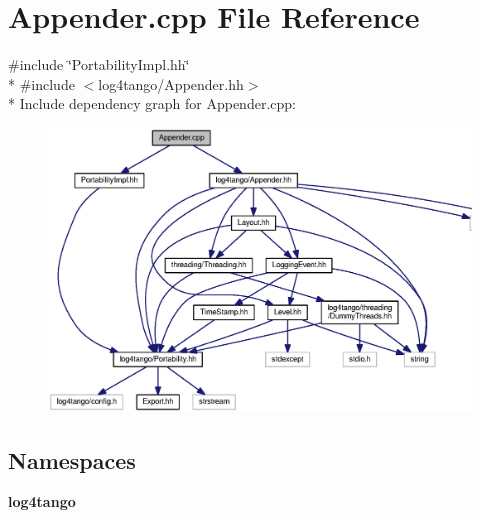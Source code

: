 \section{Appender.\-cpp File Reference}
\label{Appender_8cpp}
{\ttfamily \#include \char`\"{}Portability\-Impl.\-hh\char`\"{}}\\*
{\ttfamily \#include $<$log4tango/\-Appender.\-hh$>$}\\*
Include dependency graph for Appender.\-cpp\-:
\nopagebreak
\begin{figure}[H]
\begin{center}
\leavevmode
\includegraphics[width=350pt]{d5/d7f/Appender_8cpp__incl}
\end{center}
\end{figure}
\subsection*{Namespaces}
\begin{DoxyCompactItemize}
\item 
{\bf log4tango}
\end{DoxyCompactItemize}
